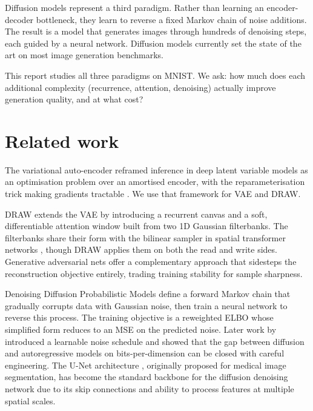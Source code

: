 \documentclass{article}
\begin{document}
Diffusion models \citep{ho2020ddpm} represent a third paradigm. Rather than
learning an encoder-decoder bottleneck, they learn to reverse a fixed Markov
chain of noise additions. The result is a model that generates images through
hundreds of denoising steps, each guided by a neural network. Diffusion models
currently set the state of the art on most image generation benchmarks.

This report studies all three paradigms on MNIST. We ask: how much does each
additional complexity (recurrence, attention, denoising) actually improve
generation quality, and at what cost?

\section{Related work}
\label{sec:related}

The variational auto-encoder reframed inference in deep latent variable models
as an optimisation problem over an amortised encoder, with the reparameterisation
trick making gradients tractable
\citep{kingma2014vae,rezende2014stochastic}. We use that framework for VAE and
DRAW.

DRAW \citep{gregor2015draw} extends the VAE by introducing a recurrent canvas
and a soft, differentiable attention window built from two 1D Gaussian
filterbanks. The filterbanks share their form with the bilinear sampler in
spatial transformer networks \citep{jaderberg2015spatial}, though DRAW applies
them on both the read and write sides. Generative adversarial nets
\citep{goodfellow2014gan} offer a complementary approach that sidesteps the
reconstruction objective entirely, trading training stability for sample
sharpness.

Denoising Diffusion Probabilistic Models \citep{ho2020ddpm} define a forward
Markov chain that gradually corrupts data with Gaussian noise, then train a
neural network to reverse this process. The training objective is a reweighted
ELBO whose simplified form reduces to an MSE on the predicted noise. Later work
by \citet{nichol2021improved} introduced a learnable noise schedule and showed
that the gap between diffusion and autoregressive models on bits-per-dimension
can be closed with careful engineering. The U-Net architecture
\citep{ronneberger2015unet}, originally proposed for medical image segmentation,
has become the standard backbone for the diffusion denoising network due to its
skip connections and ability to process features at multiple spatial scales.
\end{document}
